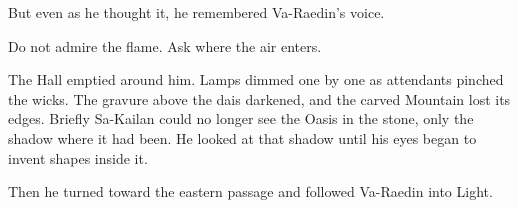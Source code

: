 But even as he thought it, he remembered Va-Raedin’s voice.\par

Do not admire the flame. Ask where the air enters.\par

The Hall emptied around him. Lamps dimmed one by one as attendants pinched the wicks. The gravure above the dais darkened, and the carved Mountain lost its edges. Briefly Sa-Kailan could no longer see the Oasis in the stone, only the shadow where it had been. He looked at that shadow until his eyes began to invent shapes inside it.\par

Then he turned toward the eastern passage and followed Va-Raedin into Light.\par

\ornament
